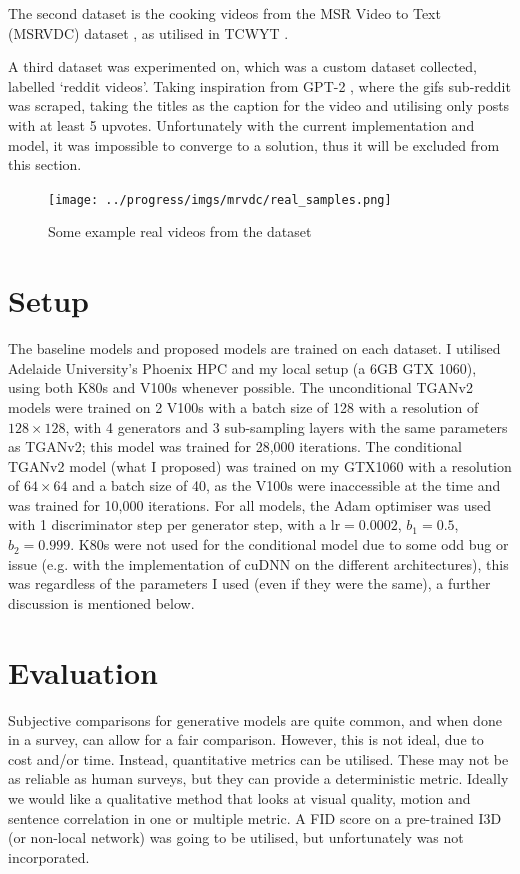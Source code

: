 \documentclass{report}
\theoremstyle{plain}
\theoremstyle{definition}
\theoremstyle{remark}
\numberwithin{equation}{section}
\numberwithin{figure}{section}
\newcommand{\<}{\langle}
\renewcommand{\>}{\rangle}
\begin{document}
The second dataset is the cooking videos from the MSR Video to Text (MSRVDC) dataset \cite{noauthor_microsoft_nodate}, as utilised in TCWYT \cite{pan_create_2018}.

A third dataset was experimented on, which was a custom dataset collected, labelled `reddit videos'. Taking inspiration from GPT-2 \cite{radford_language_2019}, where the gifs sub-reddit was scraped, taking the titles as the caption for the video and utilising only posts with at least 5 upvotes. Unfortunately with the current implementation and model, it was impossible to converge to a solution, thus it will be excluded from this section.

\begin{figure}[H]
    \centering
    \texttt{[image: ../progress/imgs/mrvdc/real\_samples.png]}
    \caption{Some example real videos from the dataset}
\end{figure}

\section{Setup}

The baseline models and proposed models are trained on each dataset. I utilised Adelaide University's Phoenix HPC and my local setup (a 6GB GTX 1060), using both K80s and V100s whenever possible. The unconditional TGANv2 models were trained on 2 V100s with a batch size of 128 with a resolution of $128\times128$, with 4 generators and 3 sub-sampling layers with the same parameters as TGANv2; this model was trained for 28,000 iterations. The conditional TGANv2 model (what I proposed) was trained
on my GTX1060 with a resolution of $64\times64$ and a batch size of 40, as the V100s were inaccessible at the time and was trained for 10,000 iterations. For all models, the Adam optimiser was used with 1 discriminator step per generator step, with a $\text{lr} = 0.0002$, $b_1 = 0.5$, $b_2 = 0.999$. K80s were not used for the conditional model due to some odd bug or issue (e.g. with the implementation of cuDNN on the different architectures), this was regardless of the parameters I used (even if they were the same), a further discussion is mentioned below.

\section{Evaluation}

Subjective comparisons for generative models are quite common, and when done in a survey, can allow for a fair comparison. However, this is not ideal, due to cost and/or time. Instead, quantitative metrics can be utilised. These may not be as reliable as human surveys, but they can provide a deterministic metric. Ideally we would like a qualitative method that looks at visual quality, motion and sentence correlation in one or multiple metric. A FID score on a pre-trained I3D (or non-local network) was going to be utilised, but unfortunately was not incorporated.
\end{document}
